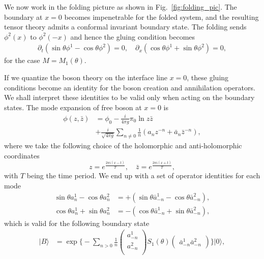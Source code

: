 We now work in the folding picture as shown in Fig.~\ref{fig:folding_pic}. The boundary at $x=0$ becomes impenetrable for the folded system, and the resulting tensor theory admits a conformal invariant boundary state. The folding sends $\phi^2(x)$ to $\phi^2(-x)$ and hence the gluing condition becomes
\begin{equation}
\begin{aligned}
\partial_t(\sin\theta\phi^1-\cos\theta\phi^2)=0, \quad
\partial_x(\cos\theta\phi^1+\sin\theta\phi^2)=0, 
\end{aligned}
\end{equation}
for the case $M = M_1(\theta)$. 

If we quantize the boson theory on the interface line $x = 0$, these gluing conditions become an identity for the boson creation and annihilation operators. We shall interpret these identities to be valid only when acting on the boundary states. The mode expansion of free boson at $x = 0$\cite{di_francesco_conformal_1997} is
\begin{equation}
\label{eq:di_mode_expansion}
\begin{aligned}
\phi(z, \bar{z} ) &= \phi_0 - \frac{i}{4\pi g } \pi_0 \ln z \bar{z} \\
 \quad&+ \frac{i}{\sqrt{4\pi g} } \sum_{n \ne 0 } \frac{1}{n} \left(a_n z^{-n} + \bar{a}_{n} \bar{z}^{-n}   \right),
\end{aligned}
\end{equation}
where we take the following choice of the holomorphic and anti-holomorphic coordinates
\begin{equation}
z= e^{ \frac{2\pi i(x - t)}{T} }, \quad \bar{z} = e^{ \frac{2\pi i( x + t  )}{T} },
\end{equation}
with $T$ being the time period. We end up with a set of operator identities for each mode
\begin{equation}
\begin{aligned}
\label{eq:rotation_a_basis}
\sin  \theta a^1_n - \cos \theta a^2_n  &= + \left( \sin  \theta \bar{a}^1_{-n} - \cos \theta \bar{a}^2_{-n} \right),\\
\cos  \theta a^1_n + \sin \theta a^2_n  &= - \left( \cos  \theta \bar{a}^1_{-n} + \sin \theta \bar{a}^2_{-n} \right), 
\end{aligned}
\end{equation}
which is valid for the following boundary state
\begin{equation}
\label{eq:bd_state}
\begin{aligned}
| B \rangle 
& =  \exp\Big\{ -\sum_{n > 0 } \frac{1}{n}
\begin{pmatrix}
a_{-n}^1\\
a_{-n}^2\\                              
\end{pmatrix}
S_1( \theta )
\begin{pmatrix}
\bar{a}_{-n}^1  \bar{a}_{-n}^2
\end{pmatrix} \Big\} |0\rangle,
\end{aligned}
\end{equation}
